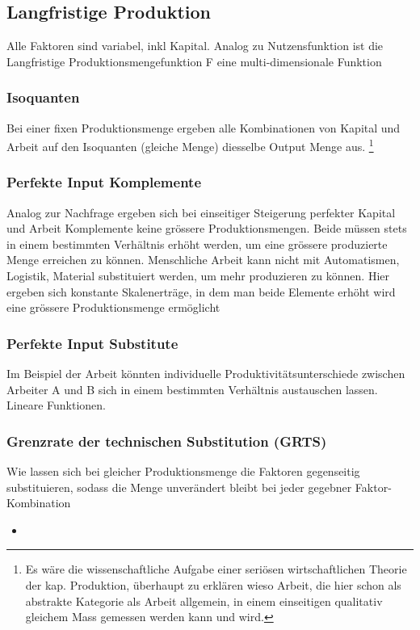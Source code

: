 

\subsection{Langfristige Produktion}
Alle Faktoren sind variabel, inkl Kapital. Analog zu Nutzensfunktion ist die Langfristige Produktionsmengefunktion F eine multi-dimensionale Funktion

\subsubsection{Isoquanten}
Bei einer fixen Produktionsmenge ergeben alle Kombinationen von Kapital und Arbeit auf den Isoquanten (gleiche Menge) diesselbe Output Menge aus. \footnote{Es wäre die wissenschaftliche Aufgabe einer seriösen wirtschaftlichen Theorie der kap. Produktion, 
überhaupt zu erklären wieso Arbeit, die hier schon als abstrakte Kategorie als Arbeit allgemein, in einem einseitigen qualitativ gleichem Mass gemessen werden kann und wird. }

\subsubsection{Perfekte Input Komplemente}
Analog zur Nachfrage ergeben sich bei einseitiger Steigerung perfekter Kapital und Arbeit Komplemente keine grössere Produktionsmengen. Beide müssen stets in einem bestimmten Verhältnis erhöht werden, um eine grössere produzierte Menge erreichen zu können.
Menschliche Arbeit kann nicht mit Automatismen, Logistik, Material substituiert werden, um mehr produzieren zu können.
Hier ergeben sich konstante Skalenerträge, in dem man beide Elemente erhöht wird eine grössere Produktionsmenge ermöglicht


\subsubsection{Perfekte Input Substitute}
Im Beispiel der Arbeit könnten individuelle Produktivitätsunterschiede zwischen Arbeiter A und B sich in einem bestimmten Verhältnis austauschen lassen. Lineare Funktionen.

\subsubsection{Grenzrate der technischen Substitution (GRTS)}
Wie lassen sich bei gleicher Produktionsmenge die Faktoren gegenseitig substituieren, sodass die Menge unverändert bleibt bei jeder gegebner Faktor-Kombination
\begin{itemize}
    \item 
\end{itemize}


